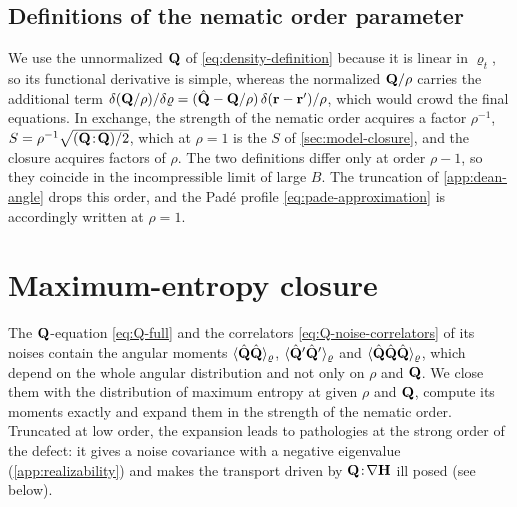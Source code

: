 \documentclass[aps,pre,reprint,superscriptaddress,longbibliography,nofootinbib
]{revtex4-2}
\begin{document}
\subsection{Definitions of the nematic order parameter}
\label{app:dean-normalisation}
We use the unnormalized $\mathbf{Q}$ of
\cref{eq:density-definition} because it is linear in
$\varrho_t$, so its functional derivative is simple,
whereas the normalized $\mathbf{Q}/\rho$ carries the additional
term
$\delta(\mathbf{Q}/\rho)/\delta\varrho
=(\hat{\mathbf{Q}}-\mathbf{Q}/\rho)\,\delta(\mathbf{r}-\mathbf{r}')/\rho$, which would crowd
the final equations. In exchange, the strength of the
nematic order acquires a factor $\rho^{-1}$,
$S=\rho^{-1}\sqrt{(\mathbf{Q}\!:\!\mathbf{Q})/2}$, which at $\rho=1$ is the
$S$ of \cref{sec:model-closure}, and the closure acquires
factors of $\rho$. The two definitions differ only at order
$\rho-1$, so they coincide in the incompressible limit of
large $B$. The truncation of \cref{app:dean-angle} drops
this order, and the Pad\'e profile
\cref{eq:pade-approximation} is accordingly written at
$\rho=1$.

\section{Maximum-entropy closure}
\label{app:closure}

The $\mathbf{Q}$-equation \cref{eq:Q-full} and the correlators
\cref{eq:Q-noise-correlators} of its noises contain the
angular moments $\langle\hat{\mathbf{Q}}\hat{\mathbf{Q}}\rangle_\varrho$,
$\langle\hat{\mathbf{Q}}'\hat{\mathbf{Q}}'\rangle_\varrho$ and
$\langle\hat{\mathbf{Q}}\hat{\mathbf{Q}}\hat{\mathbf{Q}}\rangle_\varrho$, which depend on
the whole angular distribution and not only on $\rho$ and
$\mathbf{Q}$. We close them with the distribution of maximum
entropy at given $\rho$ and $\mathbf{Q}$, compute its moments
exactly and expand them in the strength of the nematic
order. Truncated at low order, the expansion leads to
pathologies at the strong order of the defect: it gives a
noise covariance with a negative eigenvalue
(\cref{app:realizability}) and makes the transport driven
by $\mathbf{Q}\!:\!\nabla\mathbf{H}$ ill posed (see below).
\end{document}
